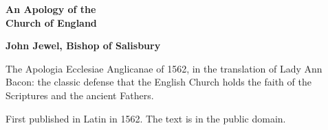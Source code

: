 \documentclass[11pt,letterpaper]{article}
\begin{document}
\color{ink}

\begin{titlepage}
\centering
\vspace*{4em}
{\LARGE\bfseries\color{heading} An Apology of the\\[0.3em]Church of England\par}
\vspace{2em}
{\Large\bfseries\color{heading} John Jewel, Bishop of Salisbury\par}
\vspace{2.5em}
{\itshape\color{subhead}\parbox{0.8\linewidth}{\centering The Apologia Ecclesiae Anglicanae of 1562, in the translation of Lady Ann Bacon: the classic defense that the English Church holds the faith of the Scriptures and the ancient Fathers.\par}}
\vfill
{\small First published in Latin in 1562. The text is in the public domain.\par}
\vspace{2em}
\end{titlepage}

\tableofcontents


\end{document}
